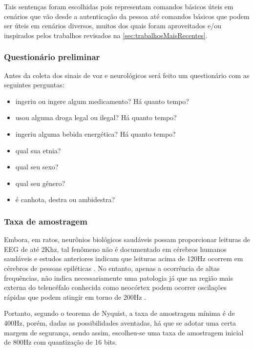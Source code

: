 			    \par Tais sentenças foram escolhidas pois representam comandos básicos úteis em cenários que vão desde a autenticação da pessoa até comandos básicos que podem ser úteis em cenários diversos, muitos dos quais foram aproveitados e/ou inspirados pelos trabalhos revisados na \autoref{sec:trabalhosMaisRecentes}.
		    
		    \subsubsection{Questionário preliminar}
		    
			    \par Antes da coleta dos sinais de voz e neurológicos será feito um questionário com as seguintes perguntas:
			    
			    \begin{itemize}
			    	\item ingeriu ou ingere algum medicamento? Há quanto tempo?
			    	\item usou alguma droga legal ou ilegal? Há quanto tempo?
			    	\item ingeriu alguma bebida energética? Há quanto tempo?
			    	\item qual sua etnia?
			    	\item qual seu sexo?
			    	\item qual seu gênero?
			    	\item é canhota, destra ou ambidestra?
			    \end{itemize}
			    
			\subsubsection{Taxa de amostragem}
			
				\par Embora, em ratos, neurônios biológicos saudáveis possam proporcionar leituras de EEG de até 2Khz, tal fenômeno não é documentado em cérebros humanos saudáveis e estudos anteriores indicam que leituras acima de 120Hz ocorrem em cérebros de pessoas epiléticas \cite{Moffett2017}. No entanto, apenas a ocorrência de altas frequências, não indica necessariamente uma patologia já que na região mais externa do telencéfalo conhecida como neocórtex podem ocorrer oscilações rápidas que podem atingir em torno de 200Hz \cite{hfreOscEngel}.
				
				\par Portanto, segundo o teorema de Nyquist, a taxa de amostragem mínima é de 400Hz, porém, dadas as possibilidades aventadas, há que se adotar uma certa margem de segurança, sendo assim, escolheu-se uma taxa de amostragem inicial de 800Hz com quantização de 16 bits.
				
